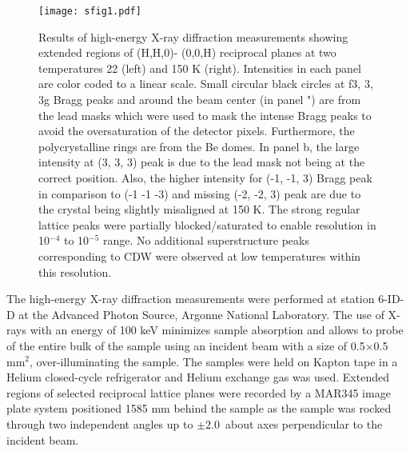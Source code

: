 \documentclass[aps,pra,reprint,superscriptaddress,floatfix]{revtex4-2}
\begin{document}
\begin{figure}[t]
\texttt{[image: sfig1.pdf]}%
\caption{Results of high-energy X-ray diffraction measurements showing extended regions of (H,H,0)-
(0,0,H) reciprocal planes at two temperatures 22 (left) and 150 K (right). Intensities in each panel are color coded to a 
linear scale.  Small circular black
circles at f3, 3, 3g Bragg peaks and around the beam center (in panel \a") are from the lead masks which were
used to mask the intense Bragg peaks to avoid the oversaturation of the detector pixels. Furthermore,
the polycrystalline rings are from the Be domes. In panel b, the large intensity at (3, 3, 3) peak is due to
the lead mask not being at the correct position. Also, the higher intensity for (-1, -1, 3) Bragg peak in
comparison to (-1 -1 -3) and missing (-2, -2, 3) peak are due to the crystal being slightly misaligned at 150 K. The strong regular lattice peaks were partially blocked/saturated to enable resolution in 10$^{-4}$ to 10$^{-5}$ range. No additional superstructure peaks corresponding to CDW were observed at low temperatures within this resolution.}
\label{xray}
\end{figure}


The high-energy X-ray diffraction measurements were performed at station 6-ID-D at the Advanced Photon Source, Argonne National Laboratory. The use of X-rays with an energy of 100 keV minimizes sample absorption and allows to probe of the entire bulk of the sample using an incident beam with a size of 0.5$\times$0.5 mm$^2$, over-illuminating the sample. The samples were held on Kapton tape in a Helium closed-cycle refrigerator and Helium exchange gas was used. Extended regions of selected reciprocal lattice planes were recorded by a MAR345 image plate system positioned 1585 mm behind the sample as the sample was rocked through two independent angles up to $\pm 2.0$\degree~about axes perpendicular to the incident beam.
\end{document}
